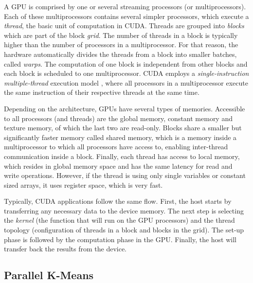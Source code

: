 A GPU is comprised by one or several streaming processors (or multiprocessors).
Each of these multiprocessors contains several simpler processors, which execute a \emph{thread}, the basic unit of computation in CUDA.
Threads are grouped into \emph{blocks} which are part of the block \emph{grid}.
The number of threads in a block is typically higher than the number of processors in a multiprocessor.
For that reason, the hardware automatically divides the threads from a block into smaller batches, called \emph{warps}.
The computation of one block is independent from other blocks and each block is scheduled to one multiprocessor.
CUDA employs a \emph{single-instruction multiple-thread} execution model \cite{lindholm2008nvidia}, where all processors in a multiprocessor execute the same instruction of their respective threads at the same time.

Depending on the architecture, GPUs have several types of memories.
Accessible to all processors (and threads) are the global memory, constant memory and texture memory, of which the last two are read-only.
Blocks share a smaller but significantly faster memory called shared memory, which is a memory inside a multiprocessor to which all processors have access to, enabling inter-thread communication inside a block.
Finally, each thread has access to local memory, which resides in global memory space and has the same latency for read and write operations.
However, if the thread is using only single variables or constant sized arrays, it uses register space, which is very fast.

Typically, CUDA applications follow the same flow.
First, the host starts by transferring any necessary data to the device memory.
The next step is selecting the \emph{kernel} (the function that will run on the GPU processors) and the thread topology (configuration of threads in a block and blocks in the grid).
The set-up phase is followed by the computation phase in the GPU.
Finally, the host will transfer back the results from the device.

\subsection{Parallel K-Means}

